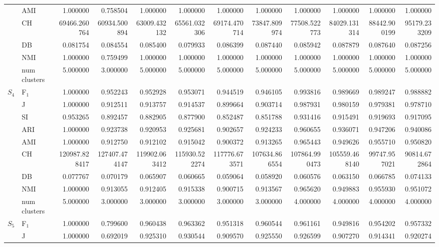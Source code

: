 \begin{tabular}{llrrrrrrrrrr}
 & AMI & 1.000000 & 0.758504 & 1.000000 & 1.000000 & 1.000000 & 1.000000 & 1.000000 & 1.000000 & 1.000000 & 1.000000 \\
 & CH & 69466.260764 & 60934.500894 & 63009.432132 & 65561.032306 & 69174.470714 & 73847.809974 & 77508.522773 & 84029.131314 & 88442.900199 & 95179.233209 \\
 & DB & 0.081754 & 0.084554 & 0.085400 & 0.079933 & 0.086399 & 0.087440 & 0.085942 & 0.087879 & 0.087640 & 0.087256 \\
 & NMI & 1.000000 & 0.759499 & 1.000000 & 1.000000 & 1.000000 & 1.000000 & 1.000000 & 1.000000 & 1.000000 & 1.000000 \\
 & num clusters & 5.000000 & 3.000000 & 5.000000 & 5.000000 & 5.000000 & 5.000000 & 5.000000 & 5.000000 & 5.000000 & 5.000000 \\
\multirow[c]{9}{*}{$S_{4}$} & F$_1$ & 1.000000 & 0.952243 & 0.952928 & 0.953071 & 0.944519 & 0.946105 & 0.993816 & 0.989669 & 0.989247 & 0.988882 \\
 & J & 1.000000 & 0.912511 & 0.913757 & 0.914537 & 0.899664 & 0.903714 & 0.987931 & 0.980159 & 0.979381 & 0.978710 \\
 & SI & 0.953265 & 0.892457 & 0.882905 & 0.877900 & 0.852487 & 0.851788 & 0.931416 & 0.915491 & 0.919693 & 0.917095 \\
 & ARI & 1.000000 & 0.923738 & 0.920953 & 0.925681 & 0.902657 & 0.924233 & 0.960655 & 0.936071 & 0.947206 & 0.940086 \\
 & AMI & 1.000000 & 0.912750 & 0.912102 & 0.915042 & 0.900372 & 0.913265 & 0.965443 & 0.949626 & 0.955710 & 0.950820 \\
 & CH & 120987.828417 & 127407.474147 & 119902.063412 & 115930.522274 & 117776.673571 & 107634.866554 & 107864.990473 & 105559.468140 & 99747.957021 & 90814.672864 \\
 & DB & 0.077767 & 0.070179 & 0.065907 & 0.060665 & 0.059064 & 0.058920 & 0.060576 & 0.063150 & 0.066785 & 0.074133 \\
 & NMI & 1.000000 & 0.913055 & 0.912405 & 0.915338 & 0.900715 & 0.913567 & 0.965620 & 0.949883 & 0.955930 & 0.951072 \\
 & num clusters & 5.000000 & 3.000000 & 3.000000 & 3.000000 & 3.000000 & 3.000000 & 4.000000 & 4.000000 & 4.000000 & 4.000000 \\
\multirow[c]{9}{*}{$S_{5}$} & F$_1$ & 1.000000 & 0.799600 & 0.960438 & 0.963362 & 0.951318 & 0.960544 & 0.961161 & 0.949816 & 0.954202 & 0.957332 \\
 & J & 1.000000 & 0.692019 & 0.925310 & 0.930544 & 0.909570 & 0.925550 & 0.926599 & 0.907270 & 0.914341 & 0.920274 \\

\end{tabular}
